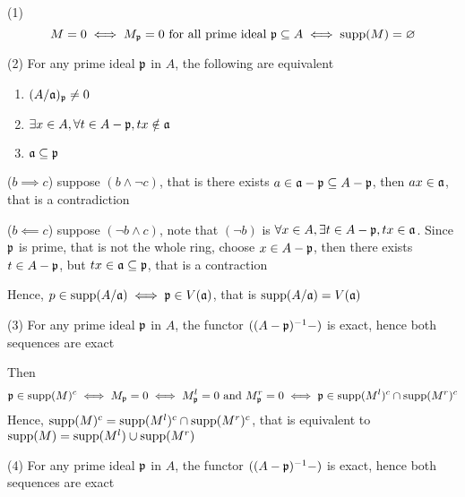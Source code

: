 \begin{longproof}
	(1) 
	$$
		M = 0 \iff M_{\mathfrak{p}} = 0 \text{ for all prime ideal } \mathfrak{p} \subseteq A \iff \operatorname{supp}(M) = \varnothing
	$$
	
	(2) For any prime ideal $\mathfrak{p}$ in $A$, the following are equivalent
	\begin{enumerate}[label=(\alph*)]
		\item $(A / \mathfrak{a})_{\mathfrak{p}} \neq 0$
		\item $\exists x \in A, \forall t \in A - \mathfrak{p}, tx \notin \mathfrak{a}$
		\item $\mathfrak{a} \subseteq \mathfrak{p}$
	\end{enumerate}
	
	($b \implies c$) suppose $(b \land \neg c)$, that is there exists $a \in \mathfrak{a} - \mathfrak{p} \subseteq A - \mathfrak{p}$, then $ax \in \mathfrak{a}$, that is a contradiction
	
	($b \impliedby c$) suppose $(\neg b \land c)$, note that $(\neg b)$ is $\forall x \in A, \exists t \in A - \mathfrak{p}, tx \in \mathfrak{a}$. Since $\mathfrak{p}$ is prime, that is not the whole ring, choose $x \in A - \mathfrak{p}$, then there exists $t \in A - \mathfrak{p}$, but $tx \in \mathfrak{a} \subseteq \mathfrak{p}$, that is a contraction
	
	Hence, $p \in \operatorname{supp}(A / \mathfrak{a}) \iff \mathfrak{p} \in V(\mathfrak{a})$, that is $\operatorname{supp}(A / \mathfrak{a}) = V(\mathfrak{a})$
	
	(3) For any prime ideal $\mathfrak{p}$ in $A$, the functor $((A - \mathfrak{p})^{-1} -)$ is exact, hence both sequences are exact
	\begin{center}
	\end{center}
	
	Then
	$$
		\mathfrak{p} \in \operatorname{supp}(M)^c \iff M_{\mathfrak{p}} = 0 \iff M^l_{\mathfrak{p}} = 0 \text{ and } M^r_{\mathfrak{p}} = 0 \iff \mathfrak{p} \in \operatorname{supp}(M^l)^c \cap \operatorname{supp}(M^r)^c
	$$
	Hence, $ \operatorname{supp}(M)^c = \operatorname{supp}(M^l)^c \cap \operatorname{supp}(M^r)^c$, that is equivalent to $\operatorname{supp}(M) = \operatorname{supp}(M^l) \cup \operatorname{supp}(M^r)$
	
	(4) For any prime ideal $\mathfrak{p}$ in $A$, the functor $((A - \mathfrak{p})^{-1} -)$ is exact, hence both sequences are exact
	
	\begin{center}
	\end{center}
	

\end{longproof}
